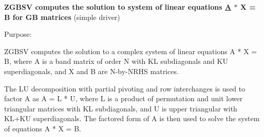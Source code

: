 {\bfseries  Z\+G\+B\+S\+V computes the solution to system of linear equations \hyperlink{classA}{A} $\ast$ X = B for G\+B matrices} (simple driver) 

 \begin{DoxyParagraph}{Purpose\+: }
\begin{DoxyVerb} ZGBSV computes the solution to a complex system of linear equations
 A * X = B, where A is a band matrix of order N with KL subdiagonals
 and KU superdiagonals, and X and B are N-by-NRHS matrices.

 The LU decomposition with partial pivoting and row interchanges is
 used to factor A as A = L * U, where L is a product of permutation
 and unit lower triangular matrices with KL subdiagonals, and U is
 upper triangular with KL+KU superdiagonals.  The factored form of A
 is then used to solve the system of equations A * X = B.\end{DoxyVerb}
 
\end{DoxyParagraph}

